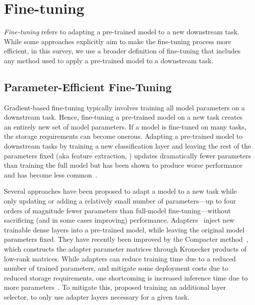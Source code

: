 \section{Fine-tuning}\label{sec:finetuning}

\textit{Fine-tuning} refers to adapting a pre-trained model to a new downstream task. While some approaches explicitly aim to make the fine-tuning process more efficient, in this survey, we use a broader definition of fine-tuning that includes any method used to apply a pre-trained model to a downstream task.

\subsection{Parameter-Efficient Fine-Tuning}

Gradient-based fine-tuning typically involves training all model parameters on a downstream task. Hence, fine-tuning a pre-trained model on a new task creates an entirely new set of model parameters. If a model is fine-tuned on many tasks, the storage requirements can become onerous. Adapting a pre-trained model to downstream tasks by training a new classification layer and leaving the rest of the parameters fixed (aka feature extraction, \citealp{Peters:2018}) updates dramatically fewer parameters than training the full model but has been shown to produce worse performance and has become less common~\citep{Devlin:2019}.

Several approaches have been proposed to adapt a model to a new task while only updating or adding a relatively small number of parameters---up to four orders of magnitude fewer parameters than full-model fine-tuning---without sacrificing (and in some cases improving) performance.
Adapters~\citep{houlsby2019parameter,bapna2019simple,rebuffi2017learning, pfeiffer-etal-2020-adapterhub} inject new trainable dense layers into a pre-trained model, while leaving the original model parameters fixed. They have recently been improved by the Compacter method~\citep{mahabadi2021compacter}, which constructs the adapter parameter matrices through Kronecker products of low-rank matrices. While adapters can reduce training time due to a reduced number of trained parameters, and mitigate some deployment costs due to reduced storage requirements, one shortcoming is increased inference time due to more parameters~\citep{ruckle-etal-2021-adapterdrop}. To mitigate this, \citet{moosavi-etal-2022-adaptable} proposed training an additional layer selector, to only use adapter layers necessary for a given task. 


